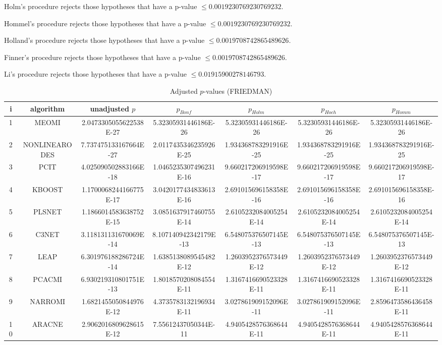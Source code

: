\documentclass[a4paper,10pt]{article}
\begin{document}
\begin{landscape}
Holm's procedure rejects those hypotheses that have a p-value $\le0.0019230769230769232$.


Hommel's procedure rejects those hypotheses that have a p-value $\le0.0019230769230769232$.


Holland's procedure rejects those hypotheses that have a p-value $\le0.0019708742865489626$.


Finner's procedure rejects those hypotheses that have a p-value $\le0.0019708742865489626$.


Li's procedure rejects those hypotheses that have a p-value $\le0.01915900278146793$.



\newpage

\begin{table}[!htp]
\centering\scriptsize
\caption{Adjusted $p$-values (FRIEDMAN)}
\begin{tabular}{ccccccc}
i&algorithm&unadjusted $p$&$p_{Bonf}$&$p_{Holm}$&$p_{Hoch}$&$p_{Homm}$\\
\hline
1&MEOMI&2.0473305055622538E-27&5.32305931446186E-26&5.32305931446186E-26&5.32305931446186E-26&5.32305931446186E-26\\
2&NONLINEARODES&7.737475133167664E-27&2.0117435346235926E-25&1.934368783291916E-25&1.934368783291916E-25&1.934368783291916E-25\\
3&PCIT&4.025090502883166E-18&1.0465235307496231E-16&9.660217206919598E-17&9.660217206919598E-17&9.660217206919598E-17\\
4&KBOOST&1.1700068244166775E-17&3.0420177434833613E-16&2.691015696158358E-16&2.691015696158358E-16&2.691015696158358E-16\\
5&PLSNET&1.1866014583638752E-15&3.0851637917460755E-14&2.6105232084005254E-14&2.6105232084005254E-14&2.6105232084005254E-14\\
6&C3NET&3.118131131670069E-14&8.107140942342179E-13&6.548075376507145E-13&6.548075376507145E-13&6.548075376507145E-13\\
7&LEAP&6.301976188286724E-14&1.6385138089545482E-12&1.2603952376573449E-12&1.2603952376573449E-12&1.2603952376573449E-12\\
8&PCACMI&6.930219310801751E-13&1.8018570208084554E-11&1.3167416690523328E-11&1.3167416690523328E-11&1.3167416690523328E-11\\
9&NARROMI&1.6821455050844976E-12&4.3735783132196934E-11&3.027861909152096E-11&3.027861909152096E-11&2.8596473586436458E-11\\
10&ARACNE&2.9062016809628615E-12&7.55612437050344E-11&4.9405428576368644E-11&4.9405428576368644E-11&4.9405428576368644E-11\\

\end{tabular}
\end{table}
\end{landscape}
\end{document}
